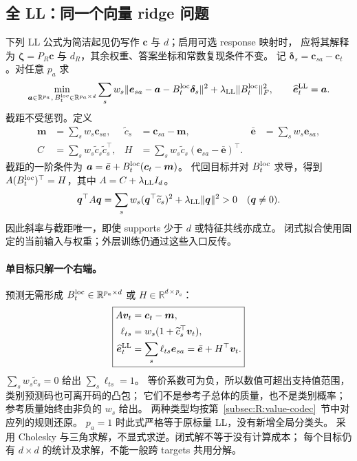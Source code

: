 \documentclass[11pt,UTF8,fontset=fandol]{ctexart}
\numberwithin{equation}{section}
\theoremstyle{definition}
\newcommand{\R}{\mathbb R}
\begin{document}
\subsection{全 LL：同一个向量 ridge 问题}
下列 LL 公式为简洁起见仍写作 $\bm c$ 与 $d$；启用可选 response 映射时，
应将其解释为 $\bm\zeta=P_{\!R}\bm c$ 与 $d_R$，其余权重、答案坐标和常数复现条件不变。
记 $\bm\delta_s=\bm c_{sa}-\bm c_t$。对任意 $p_a$ 求
\begin{equation}
 \min_{\bm a\in\R^{p_a},\,B_t^{\rm loc}\in\R^{p_a\times d}}
 \sum_s w_s\|\bm e_{sa}-\bm a-B_t^{\rm loc}\bm\delta_s\|^2
             +\lambda_{\rm LL}\|B_t^{\rm loc}\|_F^2,
 \qquad\widehat{\bm e}_t^{\rm LL}=\bm a.
 \label{eq:R:ll-objective}
\end{equation}
截距不受惩罚。定义
\begin{equation}
 \begin{aligned}
 \bm m&=\sum_s w_s\bm c_{sa},&\widetilde c_s&=\bm c_{sa}-\bm m,&
 \bar{\bm e}&=\sum_s w_s\bm e_{sa},\\
 C&=\sum_s w_s\widetilde c_s\widetilde c_s^\top,&
 H&=\sum_s w_s\widetilde c_s(\bm e_{sa}-\bar{\bm e})^\top.
 \end{aligned}
 \label{eq:R:centered-statistics}
\end{equation}
截距的一阶条件为 $\bm a=\bar{\bm e}+B_t^{\rm loc}(\bm c_t-\bm m)$。
代回目标并对 $B_t^{\rm loc}$ 求导，得到 $A(B_t^{\rm loc})^\top=H$，其中 $A=C+\lambda_{\rm LL}I_d$。
\begin{equation}
 \bm q^\top A\bm q=\sum_s w_s(\bm q^\top\widetilde c_s)^2
                    +\lambda_{\rm LL}\|\bm q\|^2>0\quad(\bm q\ne0).
 \label{eq:R:ll-positive-definite}
\end{equation}
因此斜率与截距唯一，即使 supports 少于 $d$ 或特征共线亦成立。
闭式拟合使用固定的当前输入与权重；外层训练仍通过这些入口反传。

\paragraph{单目标只解一个右端。}
预测无需形成 $B_t^{\rm loc}\in\R^{p_a\times d}$ 或 $H\in\R^{d\times p_a}$：
\begin{equation}
 \boxed{\begin{aligned}
 A\bm v_t&=\bm c_t-\bm m,\\
 \ell_{ts}&=w_s(1+\widetilde c_s^\top\bm v_t),\\
 \widehat{\bm e}_t^{\rm LL}&=\sum_s\ell_{ts}\bm e_{sa}
                           =\bar{\bm e}+H^\top\bm v_t.
 \end{aligned}}
 \label{eq:R:centered-solve}
\end{equation}
$\sum_s w_s\widetilde c_s=0$ 给出 $\sum_s\ell_{ts}=1$。
等价系数可为负，所以数值可超出支持值范围，类别预测码也可离开码的凸包；
它们不是参考子总体的质量，也不是类别概率；参考质量始终由非负的 $w_s$ 给出。
两种类型均按第~\ref{subsec:R:value-codec}~节中对应列的规则还原。
$p_a=1$ 时此式严格等于原标量 LL，没有新增全局分类头。
采用 Cholesky 与三角求解，不显式求逆。闭式解不等于没有计算成本；
每个目标仍有 $d\times d$ 的统计及求解，不能一般跨 targets 共用分解。
\end{document}
